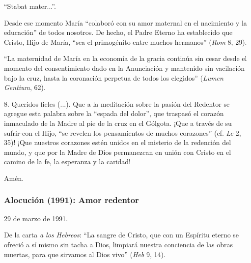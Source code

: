 			\begin{body}“Stabat mater...”. \end{body}
			
			\begin{body}Desde ese momento María “colaboró con su amor maternal en el nacimiento y la educación” de todos nosotros. De hecho, el Padre Eterno ha establecido que Cristo, Hijo de María, “sea el primogénito entre muchos hermanos” (\textit{Rom} 8, 29). \end{body}
			
			\begin{body} “La maternidad de María en la economía de la gracia continúa sin cesar desde el momento del consentimiento dado en la Anunciación y mantenido sin vacilación bajo la cruz, hasta la coronación perpetua de todos los elegidos” (\textit{Lumen Gentium}, 62). \end{body}
			
			\begin{body}8. Queridos fieles (...). Que a la meditación sobre la pasión del Redentor se agregue esta palabra sobre la “espada del dolor”, que traspasó el corazón inmaculado de la Madre al pie de la cruz en el Gólgota. ¡Que a través de su sufrir-con el Hijo, “se revelen los pensamientos de muchos corazones” (cf. \textit{Lc }2, 35)! ¡Que nuestros corazones estén unidos en el misterio de la redención del mundo, y que por la Madre de Dios permanezcan en unión con Cristo en el camino de la fe, la esperanza y la caridad! \end{body}
			
			\begin{body}Amén.\end{body}
			
			\subsubsection{Alocución (1991): Amor redentor}
			
			\begin{body}\begin{referencia}29 de marzo de 1991.\end{referencia}\end{body}
			
			\begin{body} De la carta \textit{a los Hebreos}: “La sangre de Cristo, que con un Espíritu eterno se ofreció a sí mismo sin tacha a Dios, limpiará nuestra conciencia de las obras muertas, para que sirvamos al Dios vivo” (\textit{Heb }9, 14). \end{body}
			
